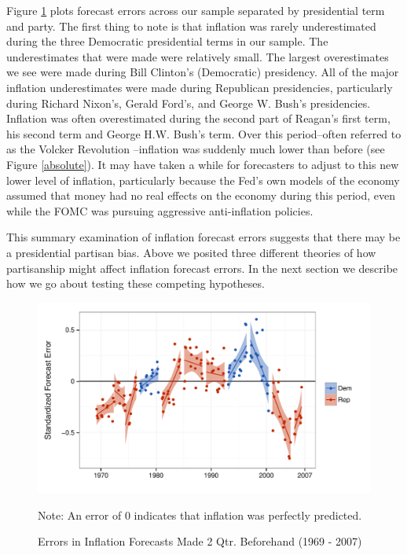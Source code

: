 \documentclass[a4paper]{article}\usepackage{graphicx, color}
\newenvironment{knitrout}{}{} %
\begin{document}
Figure \ref{errors_over_time} plots forecast errors across our sample separated by presidential term and party. The first thing to note is that inflation was rarely underestimated during the three Democratic presidential terms in our sample. The underestimates that were made were relatively small. The largest overestimates we see were made during Bill Clinton's (Democratic) presidency. All of the major inflation underestimates were made during Republican presidencies, particularly during Richard Nixon's, Gerald Ford's, and George W. Bush's presidencies. Inflation was often overestimated during the second part of Reagan's first term, his second term and George H.W. Bush's term. Over this period--often referred to as the Volcker Revolution \citep{Bartels1985}--inflation was suddenly much lower than before (see Figure \ref{absolute}). It may have taken a while for forecasters to adjust to this new lower level of inflation, particularly because the Fed's own models of the economy assumed that money had no real effects on the economy during this period, even while the FOMC was pursuing aggressive anti-inflation policies.

This summary examination of inflation forecast errors suggests that there may be a presidential partisan bias. Above we posited three different theories of how partisanship might affect inflation forecast errors. In the next section we describe how we go about testing these competing hypotheses.

\begin{figure}[t]
    \caption{Errors in Inflation Forecasts Made 2 Qtr. Beforehand (1969 - 2007)}
    \label{errors_over_time}
    \begin{center}
    
\begin{knitrout}
\color{fgcolor}

{\centering \includegraphics[width=0.8\linewidth]{figure/PartisanError} 

}



\end{knitrout}

    
    \end{center}
    \begin{singlespace}
        {\scriptsize{Note: An error of 0 indicates that inflation was perfectly predicted.}}
    \end{singlespace}
\end{figure}
\end{document}
